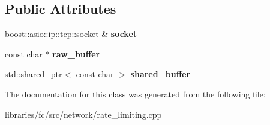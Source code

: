 \subsection*{Public Attributes}
\begin{DoxyCompactItemize}
\item 
\mbox{\label{classfc_1_1detail_1_1rate__limited__tcp__write__operation_a1b36ac1191e9d7317cc51d57dd4c5f6f}} 
boost\+::asio\+::ip\+::tcp\+::socket \& {\bfseries socket}
\item 
\mbox{\label{classfc_1_1detail_1_1rate__limited__tcp__write__operation_ab5343397e7574c37408274dbe835eb07}} 
const char $\ast$ {\bfseries raw\+\_\+buffer}
\item 
\mbox{\label{classfc_1_1detail_1_1rate__limited__tcp__write__operation_a8eecc0c17095acd1c5062ffcaed266e5}} 
std\+::shared\+\_\+ptr$<$ const char $>$ {\bfseries shared\+\_\+buffer}
\end{DoxyCompactItemize}


The documentation for this class was generated from the following file\+:\begin{DoxyCompactItemize}
\item 
libraries/fc/src/network/rate\+\_\+limiting.\+cpp\end{DoxyCompactItemize}
